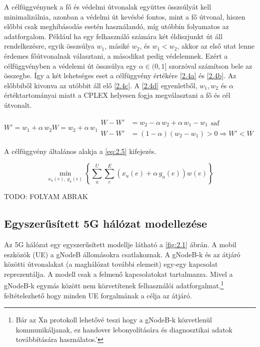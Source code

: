 \documentclass[a4paper,oneside]{article}
\begin{document}
A célfüggvénynek a fő és védelmi útvonalak együttes összsúlyát kell minimalizálnia,
azonban a védelmi út kevésbé fontos, mint a fő útvonal, hiszen előbbi csak meghibásodás esetén
használandó, míg utóbbin folyamatos az adatforgalom.
Például ha egy felhasználó számára két éldiszjunkt út áll rendelkezésre, egyik összsúlya $w_1$, másiké $w_2$,
és $w_1 < w_2$, akkor az első utat lenne érdemes főútvonalnak választani, a másodikat pedig védelemnek.
Ezért a célfüggvényben a védelemi út összsúlya egy $\alpha \in (0, 1]$ szorzóval számítson bele az összegbe.
Így a két lehetséges eset a célfüggvény értékére \eqref{2.4a} és \eqref{2.4b}.
Az előbbiből kivonva az utóbbit áll elő \eqref{2.4c}.
A \eqref{2.4d} egyenletből, $w_1, w_2$ és $\alpha$ értéktartományai miatt
a CPLEX helyesen fogja megválasztani a fő és cél útvonalt.

\begin{subequations}
  \begin{equation}
    W' = w_1 + \alpha \, w_2 \label{2.4a}
  \end{equation}
  \begin{equation}
    W = w_2 + \alpha \, w_1 \label{2.4b}
  \end{equation}
  \begin{align}
    W - W' &= w_2 - \alpha \, w_2 + \alpha \, w_1 - w_1 \substack{\text{saf}} \label{2.4c} \\
    W - W' &= \left( 1 - \alpha \right)\left( w_2 - w_1 \right) > 0 \Rightarrow W' < W \label{2.4d}
  \end{align}
\end{subequations}

A célfüggvény általános alakja a \eqref{eq:2.5} kifejezés.

\begin{equation}
  \min_{x_u(e), \, y_u(e)} \left \lbrace \sum_{u}^{U} \sum_{e}^{E} \left( x_u(e) + \alpha \, y_u(e) \right) w(e) \right \rbrace \label{eq:2.5}
\end{equation}

TODO: FOLYAM ABRAK

\subsection{Egyszerűsített 5G hálózat modellezése}
\label{sec:5gnetwork}

Az 5G hálózat egy egyszerűsített modellje látható a \ref{fig:2.1} ábrán.
A mobil eszközök (UE) a gNodeB állomásokra csatlakoznak.
A gNodeB-k és az átjáró közötti útvonalakat (a maghálózat további elemeit) egy-egy kapcsolat reprezentálja.
A modell csak a felmenő kapcsolatokat tartalmazza.
Mivel a gNodeB-k egymás között nem közvetítenek felhasználói adatforgalmat,\footnote{
  Bár az Xn protokoll lehetővé teszi hogy a gNodeB-k közvetlenül kommunikáljanak, ez handover lebonyolítására és diagnosztikai adatok továbbítására használatos.'
}
feltételezhető hogy minden UE forgalmának a célja az átjáró.
\end{document}
